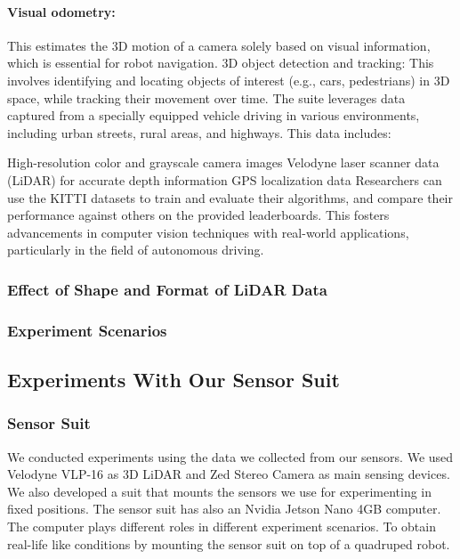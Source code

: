 \documentclass[conference]{IEEEtran}
\begin{document}
\paragraph{Visual odometry:} This estimates the 3D motion of a camera solely based on visual information, which is essential for robot navigation.
3D object detection and tracking: This involves identifying and locating objects of interest (e.g., cars, pedestrians) in 3D space, while tracking their movement over time.
The suite leverages data captured from a specially equipped vehicle driving in various environments, including urban streets, rural areas, and highways. This data includes:

High-resolution color and grayscale camera images
Velodyne laser scanner data (LiDAR) for accurate depth information
GPS localization data
Researchers can use the KITTI datasets to train and evaluate their algorithms, and compare their performance against others on the provided leaderboards. This fosters advancements in computer vision techniques with real-world applications, particularly in the field of autonomous driving.

\subsubsection{Effect of Shape and Format of LiDAR Data}
\subsubsection{Experiment Scenarios}

\subsection{Experiments With Our Sensor Suit}

\subsubsection{Sensor Suit}
We conducted experiments using the data we collected from our sensors. We used Velodyne VLP-16 as 3D LiDAR and Zed Stereo Camera as main sensing devices. We also developed a suit that mounts the sensors we use for experimenting in fixed positions. The sensor suit has also an Nvidia Jetson Nano 4GB computer. The computer plays different roles in different experiment scenarios.
To obtain real-life like conditions by mounting the sensor suit on top of a quadruped robot.
\end{document}
